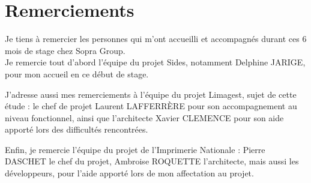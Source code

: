 \cleardoublepage

\chapter*{Remerciements}

\thispagestyle{empty}



Je tiens à remercier les personnes qui m'ont accueilli et accompagnés durant ces 6 mois de stage chez Sopra Group.
\\

Je remercie tout d'abord l'équipe du projet Sides, notamment Delphine JARIGE, pour mon accueil en ce début de stage.

J'adresse aussi mes remerciements à l'équipe du projet Limagest, sujet de cette étude : le chef de projet Laurent LAFFERRÈRE pour son accompagnement au niveau fonctionnel, ainsi que l'architecte Xavier CLEMENCE pour son aide apporté lors des difficultés rencontrées.

Enfin, je remercie l'équipe du projet de l'Imprimerie Nationale : Pierre DASCHET le chef du projet, Ambroise ROQUETTE l'architecte, mais aussi les développeurs, pour l'aide apporté lors de mon affectation au projet.